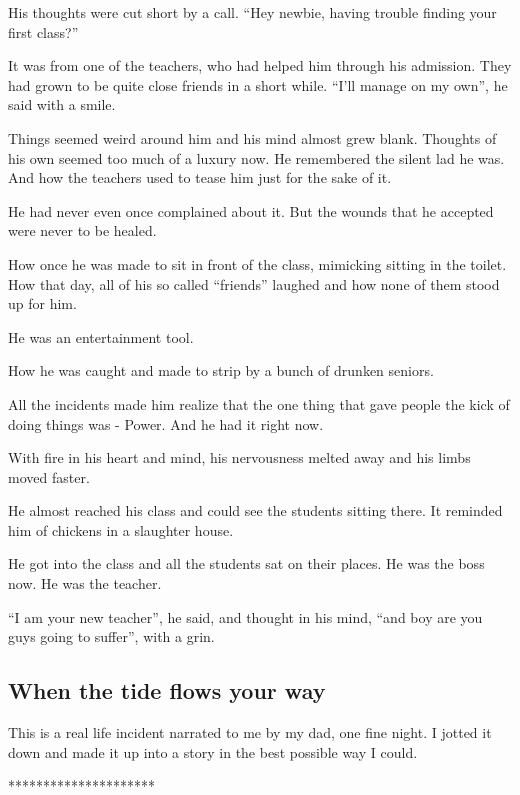 \documentclass[twoside,11pt]{article}
\begin{document}
His thoughts were cut short by a call. ``Hey newbie, having trouble finding your first class?''

It was from one of the teachers, who had helped him through his admission. They had grown to be quite close friends in a short while. ``I'll manage on my own'', he said with a smile.

Things seemed weird around him and his mind almost grew blank. Thoughts of his own seemed too much of a luxury now. He remembered the silent lad he was. And how the teachers used to tease him just for the sake of it.

He had never even once complained about it. But the wounds that he accepted were never to be healed.

How once he was made to sit in front of the class, mimicking sitting in the toilet. How that day, all of his so called ``friends'' laughed and how none of them stood up for him.

He was an entertainment tool.

How he was caught and made to strip by a bunch of drunken seniors.

All the incidents made him realize that the one thing that gave people the kick of doing things was -  Power. And he had it right now.

With fire in his heart and mind, his nervousness melted away and his limbs moved faster.

He almost reached his class and could see the students sitting there. It reminded him of chickens in a slaughter house.

He got into the class and all the students sat on their places. He was the boss now. He was the teacher.

``I am your new teacher'', he said, and thought in his mind, ``and boy are you guys going to suffer'', with a grin.

\newpage
\begin{center}
  \section{When the tide flows your way}
\end{center}
\bigskip
\bigskip
\bigskip

This is a real life incident narrated to me by my dad, one fine night. I jotted it down and made it up into a story in the best possible way I could.

\bigskip
\begin{center}
*********************
\end{center}
\end{document}
